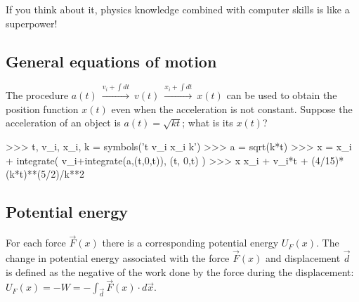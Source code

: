 \noindent
If you think about it,
physics knowledge combined with computer skills is like a superpower!


\subsection{General equations of motion}
\label{mechanics:general_eqns_of_motion}

The procedure 
$a(t) \ \overset{v_i+ \int\!dt }{\longrightarrow} \ v(t) \ \overset{x_i+ \int\!dt }{\longrightarrow} \ x(t)$
can be used to obtain the position function $x(t)$ even when the acceleration is not constant.
Suppose the acceleration of an object is $a(t)=\sqrt{k t}$; 
what is its $x(t)$?

\small
\begin{verbatimtab}
>>> t, v_i, x_i, k = symbols('t v_i x_i k')
>>> a = sqrt(k*t)
>>> x = x_i + integrate( v_i+integrate(a,(t,0,t)), (t, 0,t) )
>>> x
x_i + v_i*t + (4/15)*(k*t)**(5/2)/k**2 
\end{verbatimtab}
\normalsize





\subsection{Potential energy}
\label{mechanics:potential_energy}


For each force $\vec{F}(x)$ there is a corresponding potential energy $U_F(x)$.					  
The change in potential energy associated with the force $\vec{F}(x)$ and displacement $\vec{d}$
is defined as the negative of the work done by the force during the displacement:					 
$U_F(x) = - W = - \int_{\vec{d}} \vec{F}(x)\cdot d\vec{x}$.

